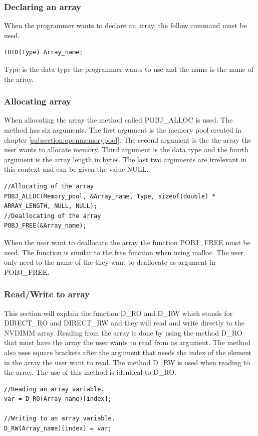\documentclass[12pt,a4paper,USenglish]{article}      %
\begin{document}
\subsubsection{Declaring an array}
When the programmer wants to declare an array, the follow command must be used.
\begin{lstlisting}
TOID(Type) Array_name;
\end{lstlisting}
Type is the data type the programmer wants to use and the name is the name of the array.

\subsubsection{Allocating array}
When allocating the array the method called POBJ\_ALLOC is used. The method has six arguments. The first argument is the memory pool created in chapter \ref{subsection:openmemorypool}. The second argument is the the array the user wants to allocate memory. Third argument is the data type and the fourth argument is the array length in bytes. The last two arguments are irrelevant in this context and can be given the value NULL.\\
\begin{lstlisting}
//Allocating of the array
POBJ_ALLOC(Memory_pool, &Array_name, Type, sizeof(double) * ARRAY_LENGTH, NULL, NULL);
//Deallocating of the array
POBJ_FREE(&Array_name);
\end{lstlisting}
When the user want to deallocate the array the function POBJ\_FREE must be used. The function is similar to the free function when using malloc. The user only need to the name of the they want to deallocate as argument in POBJ\_FREE. 

\subsubsection{Read/Write to array}
This section will explain the function D\_RO and D\_RW which stands for DIRECT\_RO and DIRECT\_RW and they will read and write directly to the NVDIMM array.
Reading from the array is done by using the method D\_RO that must have the array the user wants to read from as argument. The method also uses square brackets after the argument that needs the index of the element in the array the user want to read. The method D\_RW is used when reading to the array. The use of this method is identical to D\_RO.
\begin{lstlisting}
//Reading an array variable.
var = D_RO(Array_name)[index];

//Writing to an array variable.
D_RW(Array_name)[index] = var;
\end{lstlisting}
\end{document}
